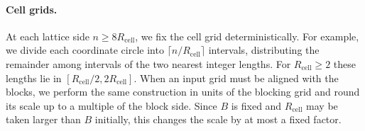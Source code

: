 \paragraph{Cell grids.}
At each lattice side $n\ge8R_{\mathrm{cell}}$, we fix the cell grid deterministically. For example, we divide each coordinate circle into $\lceil n/R_{\mathrm{cell}}\rceil$ intervals, distributing the remainder among intervals of the two nearest integer lengths. For $R_{\mathrm{cell}}\ge2$ these lengths lie in $[R_{\mathrm{cell}}/2,2R_{\mathrm{cell}}]$. When an input grid must be aligned with the blocks, we perform the same construction in units of the blocking grid and round its scale up to a multiple of the block side. Since $B$ is fixed and $R_{\mathrm{cell}}$ may be taken larger than $B$ initially, this changes the scale by at most a fixed factor.

